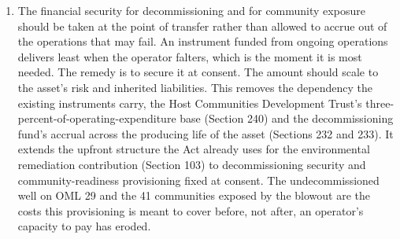 \begin{enumerate}
  operating personnel, rather than by discretion alone. A capability
  shortfall invisible at consent becomes visible only in operation, and
  an unmonitored latent exposure is the most dangerous kind. Nigeria's
  regulator already holds the powers this requires: to monitor and
  enforce compliance with the terms of leases and licenses (Section
  7(d)), and to carry out audits and investigations of licensees
  (Section 7(g)), with administrative penalties available for
  contravention (Section 231). Binding those powers to defined triggers
  connects an integrity finding to a graduated, pre-defined consequence
  rather than to discretion, subject to the operator's opportunity to
  respond. The powers already exist; the triggers are what is missing.
  The well left suspended and undecommissioned on OML 29 from 2015,
  unmonitored until it failed in 2021 (Section 4.3), is the exposure
  continuing verification is built to catch.
\item
  The financial security for decommissioning and for community exposure
  should be taken at the point of transfer rather than allowed to accrue
  out of the operations that may fail. An instrument funded from ongoing
  operations delivers least when the operator falters, which is the
  moment it is most needed. The remedy is to secure it at consent. The
  amount should scale to the asset's risk and inherited liabilities.
  This removes the dependency the existing instruments carry, the Host
  Communities Development Trust's three-percent-of-operating-expenditure
  base (Section 240) and the decommissioning fund's accrual across the
  producing life of the asset (Sections 232 and 233). It extends the
  upfront structure the Act already uses for the environmental
  remediation contribution (Section 103) to decommissioning security and
  community-readiness provisioning fixed at consent. The
  undecommissioned well on OML 29 and the 41 communities exposed by the
  blowout are the costs this provisioning is meant to cover before, not
  after, an operator's capacity to pay has eroded.
\end{enumerate}

